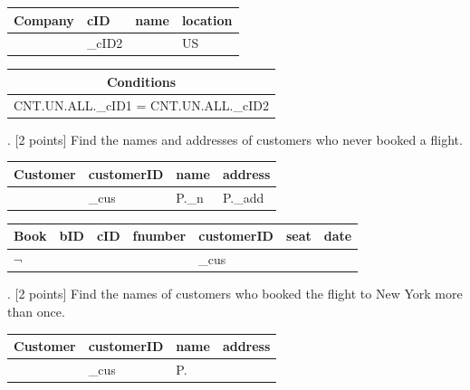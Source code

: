 \documentclass[]{article}
\begin{document}
	\begin{table}[H]
		\begin{tabular}{|l|l|l|l|}
			\hline
			Company & cID & name & location \\ \hline
					& \_cID2 & 	 &   US		\\ \hline
		\end{tabular}
	\end{table}

	\begin{table}[H]
		\begin{tabular}{|c|}
			\hline
			Conditions \\ \hline
			CNT.UN.ALL.\_cID1 = CNT.UN.ALL.\_cID2  \\ \hline
		\end{tabular}
	\end{table}
	
	. [2 points] Find the names and addresses of customers who never booked a flight. \\
	
	\begin{table}[H]
		\begin{tabular}{|l|l|l|l|}
			\hline
			Customer & customerID & name & address \\ \hline
					 &  \_cus     & P.\_n &  P.\_add	\\ \hline
		\end{tabular}
	\end{table}
	
	\begin{table}[H]
		\begin{tabular}{|l|l|l|l|l|l|l|}
			\hline
			Book & bID & cID & fnumber & customerID & seat & date \\ \hline
			$\neg$ &   &     &      &  \_cus	& 	   &  	  \\ \hline
		\end{tabular}
	\end{table}
	
	. [2 points] Find the names of customers who booked the flight to New York more than once.   \\
	
	\begin{table}[H]
		\begin{tabular}{|l|l|l|l|}
			\hline
			Customer & customerID & name & address \\ \hline
					 &  \_cus     & P.   &      	\\ \hline
		\end{tabular}
	\end{table}
	
\end{document}
